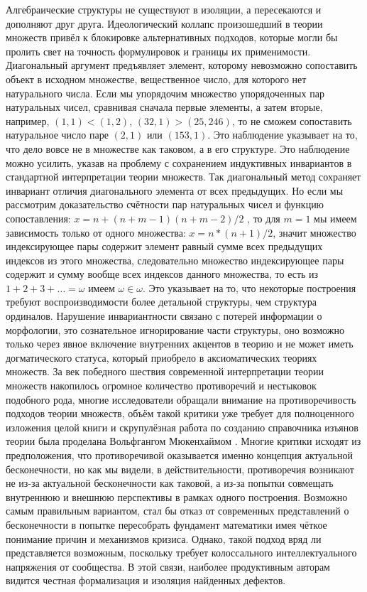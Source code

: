 \documentclass[12pt]{article}
\begin{document}
Алгебраические структуры не существуют в изоляции, а пересекаются и дополняют друг друга. Идеологический коллапс произошедший в теории множеств привёл к блокировке альтернативных подходов, которые могли бы пролить свет на точность формулировок и границы их применимости. Диагональный аргумент предъявляет элемент, которому невозможно сопоставить объект в исходном множестве, вещественное число, для которого нет натурального числа. Если мы упорядочим множество упорядоченных пар натуральных чисел, сравнивая сначала первые элементы, а затем вторые, например, $(1, 1) < (1, 2)$, $(32, 1) > (25, 246)$, то не сможем сопоставить натуральное число паре $(2, 1)$ или $(153, 1)$. Это наблюдение указывает на то, что дело вовсе не в множестве как таковом, а в его структуре. Это наблюдение можно усилить, указав на проблему с сохранением индуктивных инвариантов в стандартной интерпретации теории множеств. Так диагональный метод сохраняет инвариант отличия диагонального элемента от всех предыдущих. Но если мы рассмотрим доказательство счётности пар натуральных чисел и функцию сопоставления: $x = n + (n + m - 1)(n + m - 2)/2$ \cite{cantor-countable}, то для $m = 1$ мы имеем зависимость только от одного множества: $x = n*(n + 1)/2$, значит множество индексирующее пары содержит элемент равный сумме всех предыдущих индексов из этого множества, следовательно множество индексирующее пары содержит и сумму вообще всех индексов данного множества, то есть из $1 + 2 + 3 + \dots = \omega$ имеем $\omega \in \omega$. Это указывает на то, что некоторые построения требуют воспроизводимости более детальной структуры, чем структура ординалов. Нарушение инвариантности связано с потерей информации о морфологии, это сознательное игнорирование части структуры, оно возможно только через явное включение внутренних акцентов в теорию и не может иметь догматического статуса, который приобрело в аксиоматических теориях множеств. За век победного шествия современной интерпретации теории множеств накопилось огромное количество противоречий и нестыковок подобного рода, многие исследователи обращали внимание на противоречивость подходов теории множеств, объём такой критики уже требует для полноценного изложения целой книги и скрупулёзная работа по созданию справочника изъянов теории была проделана Вольфгангом Мюкенхаймом \cite{transfinity}. Многие критики исходят из предположения, что противоречивой оказывается именно концепция актуальной бесконечности, но как мы видели, в действительности, противоречия возникают не из-за актуальной бесконечности как таковой, а из-за попытки совмещать внутреннюю и внешнюю перспективы в рамках одного построения. Возможно самым правильным вариантом, стал бы отказ от современных представлений о бесконечности в попытке пересобрать фундамент математики имея чёткое понимание причин и механизмов кризиса. Однако, такой подход вряд ли представляется возможным, поскольку требует колоссального интеллектуального напряжения от сообщества. В этой связи, наиболее продуктивным авторам видится честная формализация и изоляция найденных дефектов.
\end{document}
